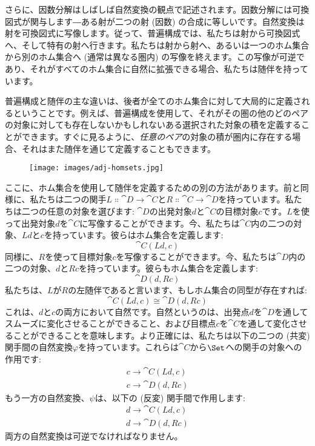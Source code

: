 さらに、因数分解はしばしば自然変換の観点で記述されます。因数分解には可換図式が関与します―ある射が二つの射 (因数) の合成に等しいです。自然変換は射を可換図式に写像します。従って、普遍構成では、私たちは射から可換図式へ、そして特有の射へ行きます。私たちは射から射へ、あるいは一つのホム集合から別のホム集合へ (通常は異なる圏内) の写像を終えます。この写像が可逆であり、それがすべてのホム集合に自然に拡張できる場合、私たちは随伴を持っています。

普遍構成と随伴の主な違いは、後者が全てのホム集合に対して大局的に定義されるということです。例えば、普遍構成を使用して、それがその圏の他のどのペアの対象に対しても存在しないかもしれないある選択された対象の積を定義することができます。すぐに見るように、\emph{任意のペア}の対象の積が圏内に存在する場合、それはまた随伴を通じて定義することもできます。

\begin{figure}[H]
  \centering
  \texttt{[image: images/adj-homsets.jpg]}
\end{figure}

\noindent
ここに、ホム集合を使用して随伴を定義するための別の方法があります。前と同様に、私たちは二つの関手$L \Colon \cat{D} \to \cat{C}$と$R \Colon \cat{C} \to \cat{D}$を持っています。私たちは二つの任意の対象を選びます: $\cat{D}$の出発対象$d$と$\cat{C}$の目標対象$c$です。$L$を使って出発対象$d$を$\cat{C}$に写像することができます。今、私たちは$\cat{C}$内の二つの対象、$L d$と$c$を持っています。彼らはホム集合を定義します: 
\[\cat{C}(L d, c)\]
同様に、$R$を使って目標対象$c$を写像することができます。今、私たちは$\cat{D}$内の二つの対象、$d$と$R c$を持っています。彼らもホム集合を定義します: 
\[\cat{D}(d, R c)\]
私たちは、$L$が$R$の左随伴であると言います、もしホム集合の同型が存在すれば: 
\[\cat{C}(L d, c) \cong \cat{D}(d, R c)\]
これは、$d$と$c$の両方において自然です。自然というのは、出発点$d$を$\cat{D}$を通してスムーズに変化させることができること、および目標点$c$を$\cat{C}$を通して変化させることができることを意味します。より正確には、私たちは以下の二つの (共変) 関手間の自然変換$\varphi$を持っています。これらは$\cat{C}$から$\Set$への関手の対象への作用です: 
\begin{gather*}
  c \to \cat{C}(L d, c) \\
  c \to \cat{D}(d, R c)
\end{gather*}
もう一方の自然変換、$\psi$は、以下の (反変) 関手間で作用します: 
\begin{gather*}
  d \to \cat{C}(L d, c) \\
  d \to \cat{D}(d, R c)
\end{gather*}
両方の自然変換は可逆でなければなりません。

